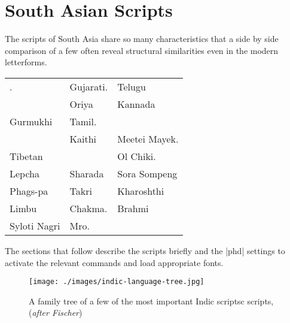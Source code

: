 \bgroup
\arial


\chapter{South Asian Scripts}

The scripts of South Asia share so many characteristics that a side by side comparison of a few often reveal structural similarities even in the 
modern letterforms.
\medskip


\begin{center}
\begin{tabular}{lll}
\nameref{sec:Devanagari}. 
&Gujarati. &Telugu\\
\nameref{sec:bengali}
&Oriya &Kannada\\
Gurmukhi &Tamil.  
&\nameref{malayalam}\\
\nameref{sec:sinhala} 
&Kaithi  
&Meetei Mayek.\\
Tibetan 
&\nameref{sec:saurashtra} 
&Ol Chiki.\\
Lepcha  &Sharada &Sora Sompeng\\
Phags-pa &Takri &Kharoshthi\\
Limbu &Chakma. & Brahmi\\
Syloti Nagri &Mro. &\\
\end{tabular}
\end{center}

The sections that follow describe the scripts briefly and the |phd| settings
to activate the relevant commands and load appropriate fonts. 

\begin{figure}[htbp]
\texttt{[image: ./images/indic-language-tree.jpg]}
\caption{A family tree of a few of the most important Indic scriptsc scripts, (\textit{after Fischer})\protect\cite{writing}}
\end{figure}



%












